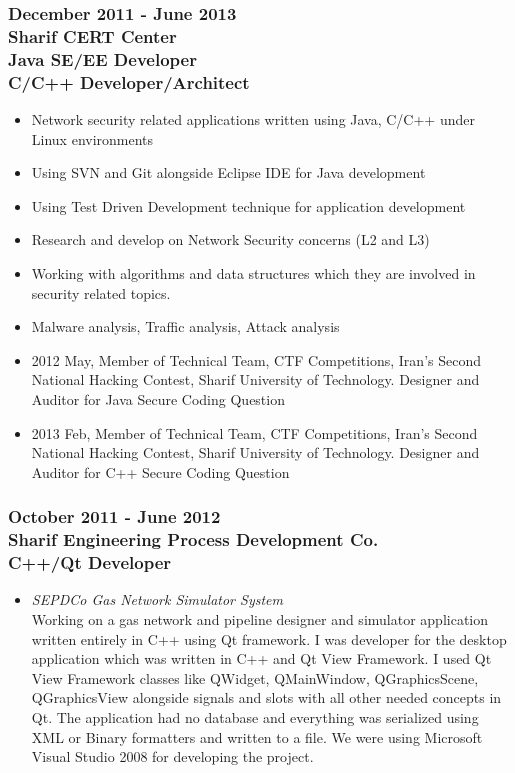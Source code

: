 \documentclass[10pt,a4paper]{article}
\begin{document}
\subsubsection{\textnormal {December 2011 - June 2013} \\ \textnormal {Sharif CERT Center} \\ Java SE/EE Developer \\ C/C++ Developer/Architect}
  \setlength{\leftskip}{0.5cm}
  \setlength{\rightskip}{1cm}
	\begin{itemize}
		\setlength{\rightskip}{2cm}
    \setlength\itemsep{0em}
	  \item \small Network security related applications written using Java, C/C++ under Linux environments
		\item \small Using SVN and Git alongside Eclipse IDE for Java development
		\item \small Using Test Driven Development technique for application development
		\item \small Research and develop on Network Security concerns (L2 and L3)
		\item \small Working with algorithms and data structures which they are involved in security related topics.
		\item \small Malware analysis, Traffic analysis, Attack analysis
		\item \small 2012 May, Member of Technical Team, CTF Competitions, Iran's Second National Hacking Contest, Sharif University of Technology. Designer and Auditor for Java Secure Coding Question
		\item \small 2013 Feb, Member of Technical Team, CTF Competitions, Iran's Second National Hacking Contest, Sharif University of Technology. Designer and Auditor for C++ Secure Coding Question
	\end{itemize}
  \setlength{\leftskip}{0pt}
  \setlength{\rightskip}{0cm}
	  
\subsubsection{\textnormal {October 2011 - June 2012} \\ \textnormal {Sharif Engineering Process Development Co.} \\ C++/Qt Developer}
  \setlength{\leftskip}{0.5cm}
  \setlength{\rightskip}{1cm}
  \begin{itemize}
    \setlength{\rightskip}{2cm}
    \setlength\itemsep{0em}
		\item \small \textit{SEPDCo Gas Network Simulator System} \\
     Working on a gas network and pipeline designer and simulator application written entirely in C++ using Qt framework. I was developer for the desktop application which was written in C++ and Qt View Framework. I used Qt View Framework classes like QWidget, QMainWindow, QGraphicsScene, QGraphicsView alongside signals and slots with all other needed concepts in Qt. The application had no database and everything was serialized using XML or Binary formatters and written to a file. We were using Microsoft Visual Studio 2008 for developing the project.
  \end{itemize}
  \setlength{\leftskip}{0pt}
  \setlength{\rightskip}{0cm}
  
\end{document}
